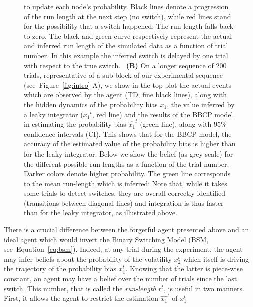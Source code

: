 \documentclass[12pt,english]{article}%
\newcommand{\seeFig}[1]{Figure~\ref{fig:#1}}
\newcommand{\seeEq}[1]{Equation~\ref{eq:#1}}
\newcommand{\AM}[1]{\textbf{\textcolor{blue}{[AM: #1]}}}
\begin{document}
\begin{figure}
{to update each node's probability.
Black lines denote a progression of the run length at the next step (no switch),
while red lines stand for the possibility that a switch happened:
The run length falls back to zero.
The black and green curve respectively represent 
the actual and inferred run length of the simulated data
as a function of trial number. 
In this example the inferred switch is delayed 
by one trial with respect to the true switch.
~\textbf{(B)} On a longer sequence of $200$ trials,
representative of a sub-block of our experimental sequence (see~\seeFig{intro}-A), %
we show in the top plot
the actual events which are observed by the agent (TD, fine black lines),
along with the hidden dynamics of the probability bias $x_1$,
the value inferred by a leaky integrator ($\bar{x_1}^t$, red line)
and the results of the BBCP model 
in estimating the probability bias $\hat{x_1}^t$ (green line),
along with $95\%$ confidence intervals (CI).
This shows that for the BBCP model,
the accuracy of the estimated value of the probability bias
is higher than for the leaky integrator.
Below we show the belief (as grey-scale) for the different possible run lengths
as a function of the trial number. 
Darker colors denote higher probability. 
The green line corresponds to the mean run-length which is inferred:
Note that, while it takes some trials to detect switches,
they are overall correctly identified (transitions between diagonal lines) and
integration is thus faster than for the leaky integrator, as illustrated above.
}
\label{fig:bayesianchangepoint}
\end{figure}
There is a crucial difference between the forgetful agent presented above
and an ideal agent which would invert the Binary Switching Model (BSM, see~\seeEq{bsm}).
Indeed, at any trial during the experiment,
the agent may infer beliefs about the probability of the volatility $x_2^t$
which itself is driving the trajectory of the probability bias $x_1^t$.
Knowing that the latter is piece-wise constant,
an agent may have a belief over the number of trials since the last switch.
This number, that is called the \emph{run-length} $r^t$, is useful in two manners.
First, it allows the agent to restrict the estimation $\hat{x_1}^{t}$ of $x_1^t$
\end{document}
